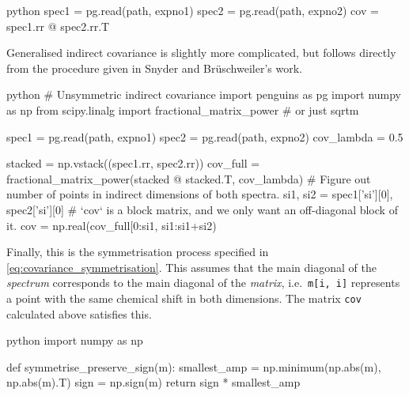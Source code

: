 \documentclass[a4paper,12pt]{article}
\begin{document}
\begin{refsection}
{\begin{tcbminted}{python}
spec1 = pg.read(path, expno1)
spec2 = pg.read(path, expno2)
cov = spec1.rr @ spec2.rr.T
\end{tcbminted}
}
\vspace{0.3cm}

Generalised indirect covariance is slightly more complicated, but follows directly from the procedure given in Snyder and Br\"uschweiler's work\autocite{Snyder2009JPCA}.

{\singlespacing
\begin{tcbminted}{python}
# Unsymmetric indirect covariance
import penguins as pg
import numpy as np
from scipy.linalg import fractional_matrix_power   # or just sqrtm

spec1 = pg.read(path, expno1)
spec2 = pg.read(path, expno2)
cov_lambda = 0.5

stacked = np.vstack((spec1.rr, spec2.rr))
cov_full = fractional_matrix_power(stacked @ stacked.T, cov_lambda)
# Figure out number of points in indirect dimensions of both spectra.
si1, si2 = spec1['si'][0], spec2['si'][0]
# `cov` is a block matrix, and we only want an off-diagonal block of it.
cov = np.real(cov_full[0:si1, si1:si1+si2)
\end{tcbminted}
}
\vspace{0.3cm}

Finally, this is the symmetrisation process specified in \cref{eq:covariance_symmetrisation}.
This assumes that the main diagonal of the \textit{spectrum} corresponds to the main diagonal of the \textit{matrix}, i.e.\ \texttt{m[i, i]} represents a point with the same chemical shift in both dimensions.
The matrix \texttt{cov} calculated above satisfies this.

{\singlespacing
\begin{tcbminted}{python}
import numpy as np

def symmetrise_preserve_sign(m):
    smallest_amp = np.minimum(np.abs(m), np.abs(m).T)
    sign = np.sign(m)
    return sign * smallest_amp
\end{tcbminted}
}

\clearpage

\AtNextBibliography{\small}
\printbibliography{}
\clearpage    %

\end{refsection}
\end{document}
